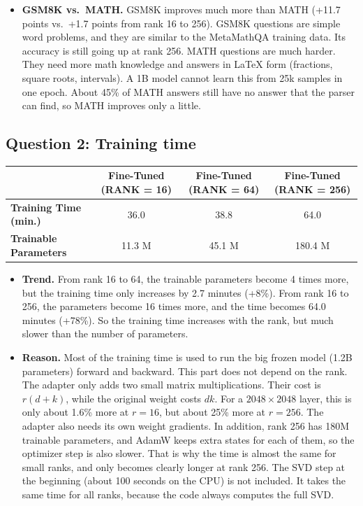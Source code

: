\documentclass[10pt,a4paper]{article}
\begin{document}
\begin{itemize}
  \item \textbf{GSM8K vs.\ MATH.} GSM8K improves much more than MATH (+11.7 points vs.\ +1.7 points from rank 16
  to 256). GSM8K questions are simple word problems, and they are similar to the MetaMathQA training data. Its
  accuracy is still going up at rank 256. MATH questions are much harder. They need more math knowledge and answers
  in LaTeX form (fractions, square roots, intervals). A 1B model cannot learn this from 25k samples in one epoch.
  About 45\% of MATH answers still have no answer that the parser can find, so MATH improves only a little.
\end{itemize}

\subsection*{Question 2: Training time}
\begin{center}\small
\begin{tabularx}{0.9\textwidth}{|l|C|C|C|}
  \hline
  & \textbf{Fine-Tuned (RANK = 16)} & \textbf{Fine-Tuned (RANK = 64)} & \textbf{Fine-Tuned (RANK = 256)} \\
  \hline
  \textbf{Training Time (min.)} & 36.0   & 38.8   & 64.0    \\ \hline
  \textbf{Trainable Parameters} & 11.3 M & 45.1 M & 180.4 M \\
  \hline
\end{tabularx}
\end{center}

\begin{itemize}
  \item \textbf{Trend.} From rank 16 to 64, the trainable parameters become 4 times more, but the training time
  only increases by 2.7 minutes (+8\%). From rank 16 to 256, the parameters become 16 times more, and the time
  becomes 64.0 minutes (+78\%). So the training time increases with the rank, but much slower than the number of
  parameters.
  \item \textbf{Reason.} Most of the training time is used to run the big frozen model (1.2B parameters) forward
  and backward. This part does not depend on the rank. The adapter only adds two small matrix multiplications. Their
  cost is $r(d+k)$, while the original weight costs $dk$. For a $2048\times2048$ layer, this is only about 1.6\%
  more at $r=16$, but about 25\% more at $r=256$. The adapter also needs its own weight gradients. In addition,
  rank 256 has 180M trainable parameters, and AdamW keeps extra states for each of them, so the optimizer step is
  also slower. That is why the time is almost the same for small ranks, and only becomes clearly longer at rank 256.
  The SVD step at the beginning (about 100 seconds on the CPU) is not included. It takes the same time for all
  ranks, because the code always computes the full SVD.
\end{itemize}
\end{document}
